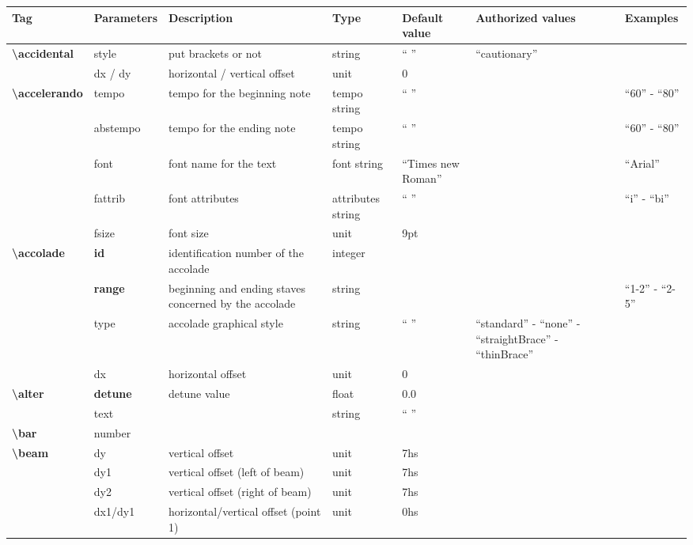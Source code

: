 \documentclass[a4paper, landscape, 10pt]{article}
\begin{document}
\begin{tabularx}{\linewidth}{p{3cm}p{2cm}p{5.5cm}p{2.5cm}p{3.5cm}p{4cm}p{3.5cm}}
    \hline
    \textbf{Tag}&\textbf{Parameters}&\textbf{Description}&\textbf{Type}&\textbf{Default value}&\textbf{Authorized values}&\textbf{Examples}\\
    \hline
    \textbf{\textbackslash{}accidental}&style&put brackets or not&string&`` ''&``cautionary''&\\
    &dx / dy&horizontal / vertical offset&unit&0&&\\
    \hline
    \textbf{\textbackslash{}accelerando}&tempo&tempo for the beginning note&tempo string&`` ''&&``60'' - ``80''\\
    &abstempo&tempo for the ending note&tempo string&`` ''&&``60'' - ``80''\\
    &font&font name for the text&font string&``Times new Roman''&&``Arial''\\
    &fattrib&font attributes&attributes string&`` ''&&``i'' - ``bi''\\
    &fsize&font size&unit&9pt&&\\
    \hline
    \textbf{\textbackslash{}accolade}&\textbf{id}&identification number of the accolade&integer&&&\\
    &\textbf{range}&beginning and ending staves concerned by the accolade&string&&&``1-2'' - ``2-5''\\
    &type&accolade graphical style&string&`` ''&``standard'' - ``none'' - ``straightBrace'' - ``thinBrace''&\\
    &dx&horizontal offset&unit&0&&\\
    \hline
    \textbf{\textbackslash{}alter}&\textbf{detune}&detune value&float&0.0&&\\
    &text&&string&`` ''&&\\ %
    \hline
    \textbf{\textbackslash{}bar}&number&&&&&\\ %
    \hline
    \textbf{\textbackslash{}beam}&dy&vertical offset&unit&7hs&&\\
    &dy1&vertical offset (left of beam)&unit&7hs&&\\
    &dy2&vertical offset (right of beam)&unit&7hs&&\\
    &dx1/dy1&horizontal/vertical offset (point 1)&unit&0hs&&\\

\end{tabularx}
\end{document}
